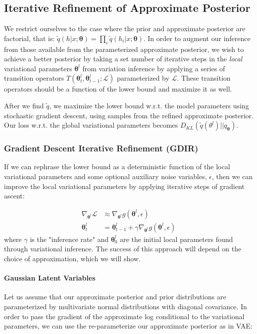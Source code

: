 \documentclass{article} %
\newcommand{\vects}[1]{\boldsymbol{#1}}
\newcommand{\TT}[0]{\vects{\theta}}
\newcommand{\grad}[0]{\nabla}
\newcommand{\LL}[0]{\mathcal{L}}
\begin{document}
\subsection{Iterative Refinement of Approximate Posterior}
We restrict ourselves to the case where the prior and approximate posterior are factorial, that is: $\tilde{q}(h|x; \TT) = \prod_i \tilde{q}(h_i|x; \TT)$. In order to augment our inference from those available from the parameterized approximate posterior, we wish to achieve a better posterior by taking a set number of iterative steps in the \emph{local} variational parameters $\TT^l$ from variation inference by applying a series of transition operators $T(\TT^l_t, \TT^l_{t-1}; \LL)$ parameterized by $\LL$. These transition operators should be a function of the lower bound and maximize it as well.

After we find $\tilde{q}$, we maximize the lower bound w.r.t. the model parameters using stochastic gradient descent, using samples from the refined approximate posterior. Our loss w.r.t. the global variational parameters becomes $D_{KL}(\tilde{q}(\theta^l)||q_{\TT})$.

\subsubsection{Gradient Descent Iterative Refinement (GDIR)}
If we can rephrase the lower bound as a deterministic function of the local variational parameters and some optional auxiliary noise variables, $\epsilon$, then we can improve the local variational parameters by applying iterative steps of gradient ascent:

\begin{align}
\grad_{\TT^l} \LL &\approx \grad_{\TT^l} g(\TT^l, \epsilon) \nonumber \\
\TT^l_t &= \TT^l_{t-1} + \gamma \grad_{\TT^l} g(\TT^l, \epsilon)
\end{align}
where $\gamma$ is the "inference rate" and $\TT^l_0$ are the initial local parameters found through variational inference. The success of this approach will depend on the choice of approximation, which we will show.

\paragraph{Gaussian Latent Variables}

Let us assume that our approximate posterior and prior distributions are parameterized by multivariate normal distributions with diagonal covariance. In order to pass the gradient of the approximate log conditional to the variational parameters, we can use the re-parameterize our approximate posterior as in VAE:
\end{document}
